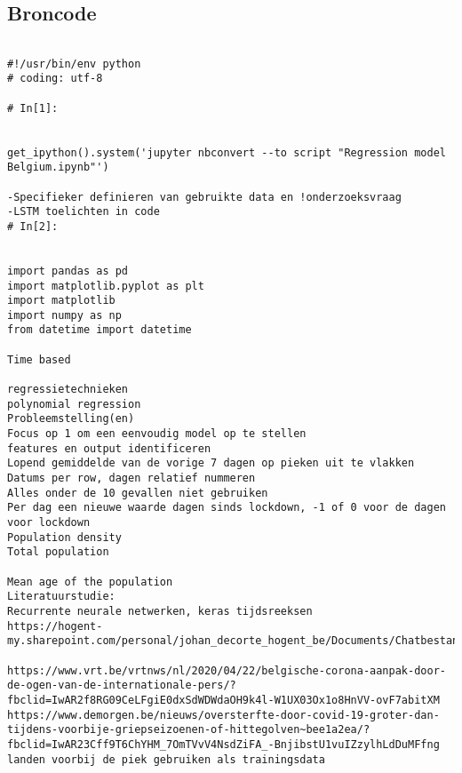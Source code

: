 \chapter{}
\label{ch:Broncode}


\section{Broncode} %
\label{sec:Broncode}

\lstset{language=Python}
\lstset{frame=lines}
\lstset{basicstyle=\footnotesize}
\begin{lstlisting}

#!/usr/bin/env python
# coding: utf-8

# In[1]:


get_ipython().system('jupyter nbconvert --to script "Regression model Belgium.ipynb"')

-Specifieker definieren van gebruikte data en !onderzoeksvraag
-LSTM toelichten in code
# In[2]:


import pandas as pd
import matplotlib.pyplot as plt
import matplotlib
import numpy as np
from datetime import datetime

Time based

regressietechnieken
polynomial regression
Probleemstelling(en)
Focus op 1 om een eenvoudig model op te stellen
features en output identificeren
Lopend gemiddelde van de vorige 7 dagen op pieken uit te vlakken
Datums per row, dagen relatief nummeren
Alles onder de 10 gevallen niet gebruiken
Per dag een nieuwe waarde dagen sinds lockdown, -1 of 0 voor de dagen voor lockdown
Population density
Total population

Mean age of the population
Literatuurstudie:
Recurrente neurale netwerken, keras tijdsreeksen
https://hogent-my.sharepoint.com/personal/johan_decorte_hogent_be/Documents/Chatbestanden%20van%20Microsoft%20Teams/RNN_Sentiment_Analysis.ipynb

https://www.vrt.be/vrtnws/nl/2020/04/22/belgische-corona-aanpak-door-de-ogen-van-de-internationale-pers/?fbclid=IwAR2f8RG09CeLFgiE0dxSdWDWdaOH9k4l-W1UX03Ox1o8HnVV-ovF7abitXM
https://www.demorgen.be/nieuws/oversterfte-door-covid-19-groter-dan-tijdens-voorbije-griepseizoenen-of-hittegolven~bee1a2ea/?fbclid=IwAR23Cff9T6ChYHM_7OmTVvV4NsdZiFA_-BnjibstU1vuIZzylhLdDuMFfng
landen voorbij de piek gebruiken als trainingsdata



\end{lstlisting}
